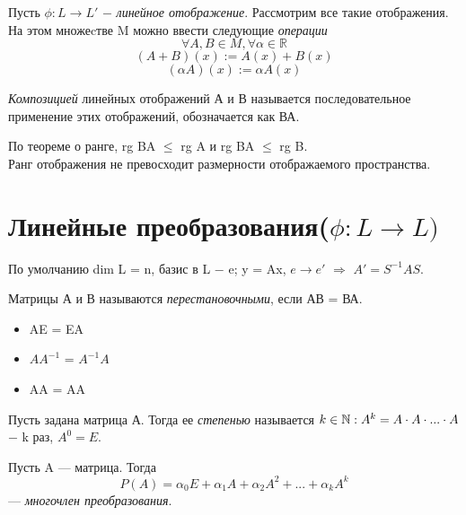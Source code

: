 \begin{definition}
    Пусть $\phi: L \longrightarrow L'$ $-$ \textit{линейное отображение}.  Рассмотрим все такие отображения. На этом множеcтве M можно ввести следующие \textit{операции}
    \[
    \forall A, B \in M, \forall \alpha \in \mathbb{R}
    \]
    \[
    (A + B)(x) := A(x) + B(x)
    \]
    \[
    (\alpha A)(x) := \alpha A(x)
    \]
\end{definition}

\begin{definition}
   \textit{Композицией} линейных отображений А и В называется последовательное применение этих отображений, обозначается как ВА.
\end{definition}

По теореме о ранге, rg BA $\leq$ rg A и rg BA $\leq$ rg B.\\

Ранг отображения не превосходит размерности отображаемого пространства.\\

\section{Линейные преобразования($\phi:L\longrightarrow L)$}

По умолчанию dim L = n, базис в L $-$ e; y = Ax, $e \longrightarrow e'$ $\Longrightarrow$ $A' = S^{-1}AS$.\\

\begin{definition}
    Матрицы А и В называются \textit{перестановочными}, если АВ = ВА.
\end{definition}
\begin{itemize}
    \item AE = EA
    \item $AA^{-1}$ = $A^{-1}A$
    \item AA = AA
\end{itemize}

\begin{definition}
    Пусть задана матрица А. Тогда ее \textit{степенью} называется $k \in \mathbb{N} : \\A^k = A \cdot A \cdot ... \cdot A$ $-$ k раз, $A^0 = E$.
\end{definition}

\begin{definition}
    Пусть A --- матрица. Тогда
    \[
    P(A) = \alpha_0E + \alpha_1A + \alpha_2A^2 + ... + \alpha_kA^k
    \]
    --- \textit{многочлен преобразования}.
\end{definition}

